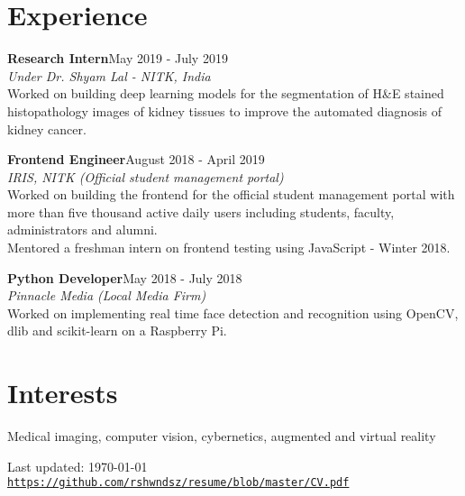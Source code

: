 \documentclass[letterpaper]{article}
\def\footerlink{https://github.com/rshwndsz/resume/blob/master/CV.pdf}
\renewenvironment{itemize}{
  \begin{list}{}{
    \setlength{\leftmargin}{1.5em}
  }
}{
  \end{list}
}
\begin{document}
\section*{Experience}
  \begin{itemize}
    \item \textbf{Research Intern}\hfill{May 2019 - July 2019}\\
    \textit{Under Dr. Shyam Lal - NITK, India}\\
    Worked on building deep learning models for the segmentation of H\&E stained histopathology images of kidney tissues to improve the automated diagnosis of kidney cancer.

    \item \textbf{Frontend Engineer}\hfill{August 2018 - April 2019}\\
    \textit{IRIS, NITK (Official student management portal)}\\
    Worked on building the frontend for the official student management portal with more than five thousand active daily users including students, faculty, administrators and alumni.\\
    Mentored a freshman intern on frontend testing using JavaScript - Winter 2018.

    \item \textbf{Python Developer}\hfill{May 2018 - July 2018}\\
    \textit{Pinnacle Media (Local Media Firm)}\\
    Worked on implementing real time face detection and recognition using OpenCV, dlib and scikit-learn on a Raspberry Pi.
  \end{itemize}

\section*{Interests}
  \begin{itemize}
    \item Medical imaging, computer vision, cybernetics, augmented and virtual reality
  \end{itemize}

\bigskip

\begin{center}
  \begin{footnotesize}
    Last updated: \today \\
    \href{\footerlink}{\texttt{\footerlink}}
  \end{footnotesize}
\end{center}
\end{document}
